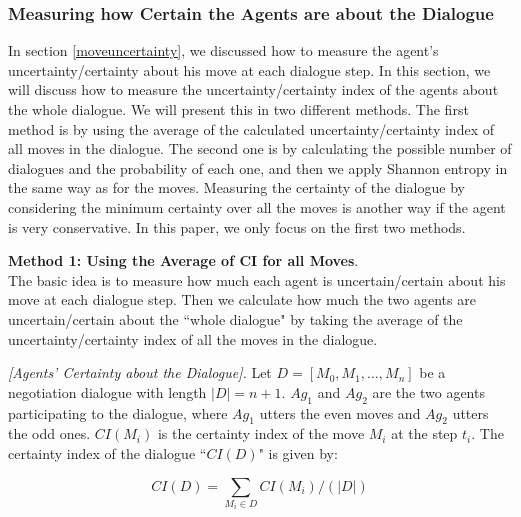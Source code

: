 \subsubsection{Measuring how Certain the Agents are about the Dialogue}\label{dialogueuncertainty}
In section \ref{moveuncertainty}, we discussed how to measure the agent's uncertainty/certainty about his move at each dialogue
step. In this section, we will discuss how to measure the uncertainty/certainty index of the agents about the whole dialogue.
We will present this in two different methods. The first method is by using the average of the calculated uncertainty/certainty index
of all moves in the dialogue. The second one is by calculating the possible number of dialogues and the probability of each one, and
then we apply Shannon entropy in the same way as for the moves. Measuring the certainty of the dialogue by considering the minimum
certainty over all the moves is another way if the agent is very conservative. In this paper, we only focus on the first two methods.

\textbf{Method 1: Using the Average of CI for all Moves}.\\
The basic idea is to measure how much each agent is uncertain/certain about his move at each dialogue step. Then we
calculate how much the two agents are uncertain/certain about the ``whole dialogue" by taking the average of the
uncertainty/certainty index of all the moves in the dialogue.

\begin{definition}{\emph{[Agents' Certainty about the Dialogue]. }} \label{agentsCIDialogue}
Let $D =[M_0, M_1, \ldots, M_n]$ be a negotiation dialogue with length $|D| = n+1$. $Ag_1$ and $Ag_2$ are the two agents
participating to the dialogue, where $Ag_1$ utters the even moves and $Ag_2$ utters the odd ones. $CI(M_i)$ is the certainty index
of the move $M_i$ at the step $t_i$. The certainty index of the dialogue ``$CI(D)$" is given by:

\begin{equation}\label{equation12}
CI(D) = \sum_{M_i\in D} CI(M_i)/(|D|)
\end{equation}

\end{definition}

